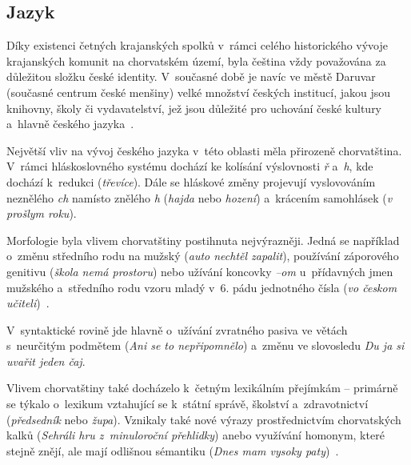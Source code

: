 \hypertarget{jazyk-3}{%
\subsection*{Jazyk}\label{jazyk-3}}

Díky existenci četných krajanských spolků v~rámci celého historického vývoje krajanských komunit na chorvatském území, byla čeština vždy považována za důležitou složku české identity. V~současné době je navíc ve městě Daruvar (současné centrum české menšiny) velké množství českých institucí, jakou jsou knihovny, školy či vydavatelství, jež jsou důležité pro uchování české kultury a~hlavně českého jazyka~\parencite{Veltruski2018}.

Největší vliv na vývoj českého jazyka v~této oblasti měla přirozeně chorvatština. V~rámci hláskoslovného systému dochází ke kolísání výslovnosti \emph{ř} a~\emph{h}, kde dochází k~redukci (\emph{třevíce}). Dále se hláskové změny projevují vyslovováním neznělého \emph{ch} namísto znělého \emph{h} (\emph{hajda} nebo \emph{hození}) a~krácením samohlásek (\emph{v prošlym roku}).

Morfologie byla vlivem chorvatštiny postihnuta nejvýrazněji. Jedná se například o~změnu středního rodu na mužský (\emph{auto nechtěl zapalit}), používání záporového genitivu (\emph{škola nemá prostoru}) nebo užívání koncovky \emph{--om} u~přídavných jmen mužského a~středního rodu vzoru mladý v~6. pádu jednotného čísla (\emph{vo českom učiteli})~\parencite{Kokaisl2012}.

V~syntaktické rovině jde hlavně o~užívání zvratného pasiva ve větách s~neurčitým podmětem (\emph{Ani se to nepřipomnělo}) a~změnu ve slovosledu \emph{Du ja si uvařit jeden čaj}.

Vlivem chorvatštiny také docházelo k~četným lexikálním přejímkám -- primárně se týkalo o~lexikum vztahující se k~státní správě, školství a~zdravotnictví (\emph{předsedník} nebo \emph{župa}). Vznikaly také nové výrazy prostřednictvím chorvatských kalků (\emph{Sehráli hru z~minuloroční přehlidky}) anebo využívání homonym, které stejně znějí, ale mají odlišnou sémantiku (\emph{Dnes mam vysoky paty})~\parencite{Kokaisl2012}.
